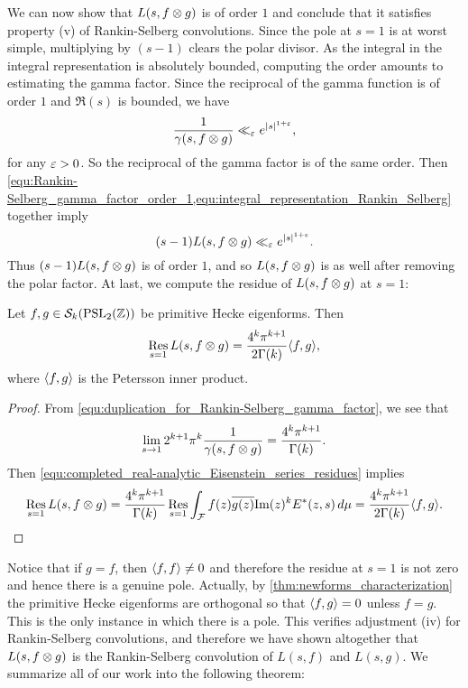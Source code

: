       We can now show that $L(s,f \otimes g)$ is of order $1$ and conclude that it satisfies property (v) of Rankin-Selberg convolutions. Since the pole at $s = 1$ is at worst simple, multiplying by $(s-1)$ clears the polar divisor. As the integral in the integral representation is absolutely bounded, computing the order amounts to estimating the gamma factor. Since the reciprocal of the gamma function is of order $1$ and $\Re(s)$ is bounded, we have
      \begin{equation}\label{equ:Rankin-Selberg_gamma_factor_order_1}
        \frac{1}{\gamma(s,f \otimes g)} \ll_{\varepsilon} e^{|s|^{1+\varepsilon}},
      \end{equation}
      for any $\varepsilon > 0$. So the reciprocal of the gamma factor is of the same order. Then \cref{equ:Rankin-Selberg_gamma_factor_order_1,equ:integral_representation_Rankin_Selberg} together imply
      \[
        (s-1)L(s,f \otimes g) \ll_{\varepsilon} e^{|s|^{1+\varepsilon}}.
      \]
      Thus $(s-1)L(s,f \otimes g)$ is of order $1$, and so $L(s,f \otimes g)$ is as well after removing the polar factor. At last, we compute the residue of $L(s,f \otimes g)$ at $s = 1$:
      \begin{proposition}
        Let $f,g \in \mathcal{S}_{k}(\mathrm{PSL}_{2}(\mathbb{Z}))$ be primitive Hecke eigenforms. Then
        \[
          \operatorname*{\mathrm{Res}}_{s = 1}L(s,f \otimes g) = \frac{4^{k}\pi^{k+1}}{2\Gamma(k)}\langle f,g\rangle,
        \]
        where $\langle f,g\rangle$ is the Petersson inner product.
      \end{proposition}
      \begin{proof}
        From \cref{equ:duplication_for_Rankin-Selberg_gamma_factor}, we see that
        \[
          \lim_{s \to 1}2^{k+1}\pi^{k}\frac{1}{\gamma(s,f \otimes g)} = \frac{4^{k}\pi^{k+1}}{\Gamma(k)}.
        \]
        Then \cref{equ:completed_real-analytic_Eisenstein_series_residues} implies
        \[
          \operatorname*{\mathrm{Res}}_{s = 1}L(s,f \otimes g) = \frac{4^{k}\pi^{k+1}}{\Gamma(k)}\operatorname*{\mathrm{Res}}_{s = 1}\int_{\mathcal{F}}f(z)\overline{g(z)}\mathrm{Im}(z)^{k}E^{\ast}(z,s)\,d\mu = \frac{4^{k}\pi^{k+1}}{2\Gamma(k)}\langle f,g\rangle.
        \]
      \end{proof}

      Notice that if $g = f$, then $\langle f,f\rangle \neq 0$ and therefore the residue at $s = 1$ is not zero and hence there is a genuine pole. Actually, by \cref{thm:newforms_characterization} the primitive Hecke eigenforms are orthogonal so that $\langle f,g\rangle = 0$ unless $f = g$. This is the only instance in which there is a pole. This verifies adjustment (iv) for Rankin-Selberg convolutions, and therefore we have shown altogether that $L(s,f \otimes g)$ is the Rankin-Selberg convolution of $L(s,f)$ and $L(s,g)$. We summarize all of our work into the following theorem:

